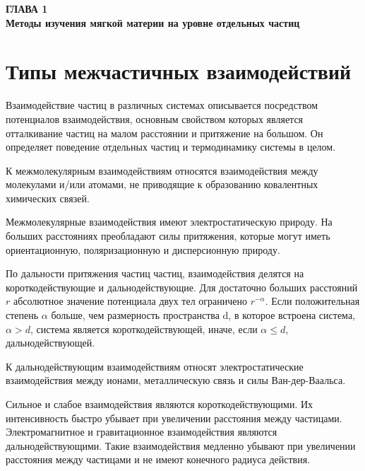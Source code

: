 
\newpage
\begin{center}
\textbf{\large ГЛАВА 1 \\ Методы изучения мягкой материи на уровне отдельных частиц}
\end{center}




\section{Типы межчастичных взаимодействий}\label{C1_1}

 Взаимодействие частиц в различных системах описывается посредством потенциалов взаимодействия, основным свойством которых является отталкивание частиц на малом расстоянии и притяжение на большом. Он определяет поведение отдельных частиц и термодинамику системы в целом.
 
 К межмолекулярным взаимодействиям относятся взаимодействия между молекулами и/или атомами, не приводящие к образованию ковалентных химических связей.

Межмолекулярные взаимодействия имеют электростатическую природу. На больших расстояниях преобладают силы притяжения, которые могут иметь ориентационную, поляризационную и дисперсионную природу.

По дальности притяжения частиц частиц, взаимодействия делятся на короткодействующие и дальнодействующие. Для достаточно больших расстояний $r$ абсолютное значение потенциала двух тел ограничено $r^{-\alpha}$. Если положительная степень $\alpha$ больше, чем размерность пространства d, в которое встроена система, $\alpha>d$, система является короткодействующей, иначе, если $\alpha \leq d$, дальнодействующей.

К дальнодействующим взаимодействиям относят электростатические взаимодействия между ионами, металлическую связь и силы Ван-дер-Ваальса. 

Сильное и слабое взаимодействия являются короткодействующими. Их интенсивность быстро убывает при увеличении расстояния между частицами.  Электромагнитное и гравитационное взаимодействия являются дальнодействующими. Такие взаимодействия медленно убывают при увеличении расстояния между частицами и не имеют конечного радиуса действия.

